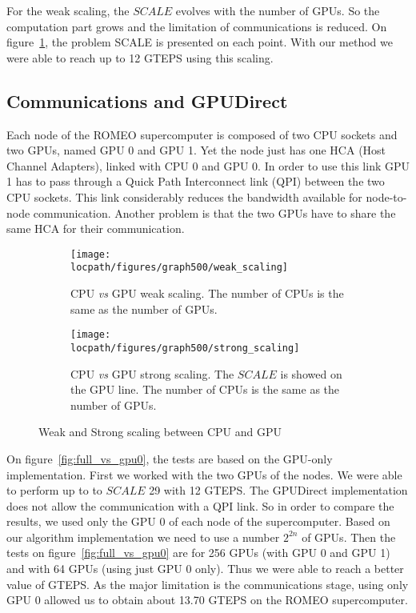 For the weak scaling, the $SCALE$ evolves with the number of GPUs. 
So the computation part grows and the limitation of communications is reduced. 
On figure~\ref{fig:bfs_weak_scaling}, the problem SCALE is presented on each point. 
With our method we were able to reach up to 12 GTEPS using this scaling. 

\subsection{Communications and GPUDirect}

Each node of the ROMEO supercomputer is composed of two CPU sockets and two GPUs, named GPU 0 and GPU 1.
Yet the node just has one HCA (Host Channel Adapters), linked with CPU 0 and GPU 0. 
In order to use this link GPU 1 has to pass through a Quick Path Interconnect link (QPI) between the two CPU sockets. 
This link considerably reduces the bandwidth available for node-to-node communication. 
Another problem is that the two GPUs have to share the same HCA for their communication. 


\begin{figure}[htb]
\begin{subfigure}[t]{0.48\linewidth}
\centering
\texttt{[image: \\locpath/figures/graph500/weak\_scaling]}
\caption[]{CPU \textit{vs} GPU weak scaling. The number of CPUs is the same as the number of GPUs.}
\label{fig:bfs_weak_scaling}
\end{subfigure}
\hfill
\begin{subfigure}[t]{0.48\linewidth}
\centering
\texttt{[image: \\locpath/figures/graph500/strong\_scaling]}
\caption[]{CPU \textit{vs} GPU strong scaling. The $SCALE$ is showed on the GPU line. The number of CPUs is the same as the number of GPUs.}
\label{fig:bfs_strong_scaling}
\end{subfigure}
\caption{Weak and Strong scaling between CPU and GPU}
\end{figure}


On figure~\ref{fig:full_vs_gpu0}, the tests are based on the GPU-only implementation. 
First we worked with the two GPUs of the nodes. 
We were able to perform up to to $SCALE$ 29 with 12 GTEPS. 
The GPUDirect implementation does not allow the communication with a QPI link. 
So in order to compare the results, we used only the GPU 0 of each node of the supercomputer. 
Based on our algorithm implementation we need to use a number $2^{2n}$ of GPUs. 
Then the tests on figure~\ref{fig:full_vs_gpu0} are for 256 GPUs (with GPU 0 and GPU 1) and with 64 GPUs (using just GPU 0 only). 
Thus we were able to reach a better value of GTEPS. 
As the major limitation is the communications stage, using only GPU 0 allowed us to obtain about 13.70 GTEPS on the ROMEO supercomputer. 

